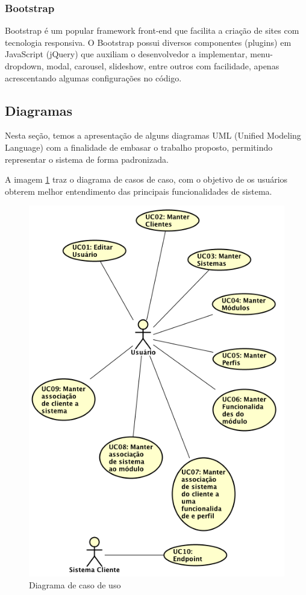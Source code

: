 \subsubsection{Bootstrap}


Bootstrap é um popular framework front-end que facilita a criação de sites com tecnologia responsiva.
O Bootstrap possui diversos componentes (plugins) em JavaScript (jQuery) que auxiliam o desenvolvedor a implementar, menu-dropdown, modal, carousel, slideshow, entre outros com facilidade, apenas acrescentando algumas configurações no código.


\subsection{Diagramas}\label{diagramas}


Nesta seção, temos a apresentação de alguns diagramas UML (Unified Modeling Language) com a finalidade de embasar o trabalho proposto, permitindo representar o sistema de forma padronizada.


A imagem \ref{fig:Diagrama de caso de uso} traz o diagrama de casos de caso, com o objetivo de os usuários obterem melhor entendimento das principais funcionalidades de  sistema.


\begin{figure}
	\label{fig:Diagrama de caso de uso}
	\includegraphics[width=1\textwidth]{img/Diagrama_de_caso_de_uso}
	\caption{Diagrama de caso de uso}
\end{figure}


